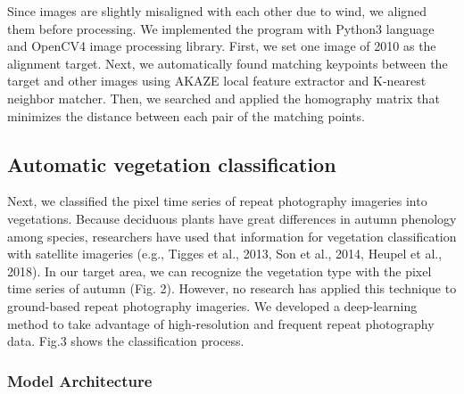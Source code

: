 \documentclass{article}
\begin{document}
Since images are slightly misaligned with each other due to wind, we
aligned them before processing. We implemented the program with Python3
language and OpenCV4 image processing library. First, we set one image
of 2010 as the alignment target. Next, we automatically found matching
keypoints between the target and other images using AKAZE local feature
extractor and K-nearest neighbor matcher. Then, we searched and applied
the homography matrix that minimizes the distance between each pair of
the matching points.

\hypertarget{automatic-vegetation-classification}{%
\subsection{Automatic vegetation
classification}\label{automatic-vegetation-classification}}

Next, we classified the pixel time series of repeat photography
imageries into vegetations. Because deciduous plants have great
differences in autumn phenology among species, researchers have used
that information for vegetation classification with satellite imageries
(e.g., Tigges et al., 2013, Son et al., 2014, Heupel et al., 2018). In
our target area, we can recognize the vegetation type with the pixel
time series of autumn (Fig. 2). However, no research has applied this
technique to ground-based repeat photography imageries. We developed a
deep-learning method to take advantage of high-resolution and frequent
repeat photography data. Fig.3 shows the classification process.

\hypertarget{model-architecture}{%
\subsubsection{Model Architecture}\label{model-architecture}}
\end{document}
